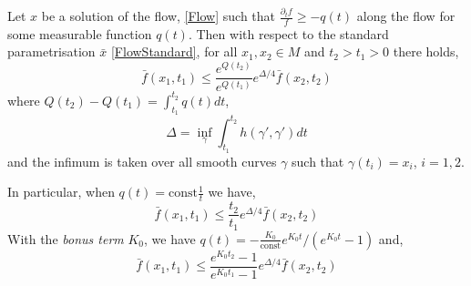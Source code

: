 \begin{thm}
Let $x$ be a solution of the flow, \eqref{Flow} such that $\tfrac{\partial_t f}{f} \geq -q(t)$ along the flow for some measurable function $q(t)$. Then with respect to the standard parametrisation $\bar{x}$ \eqref{FlowStandard}, for all $x_1, x_2 \in M$ and $t_2 > t_1 > 0$ there holds,
\[
\bar{f} (x_1, t_1) \leq \frac{e^{Q(t_2)}}{e^{Q(t_1)}} e^{\Delta/4} \bar{f} (x_2, t_2)
\]
where $Q(t_2) - Q(t_1) = \int_{t_1}^{t_2} q(t) dt$,
\[
\Delta = \inf_{\gamma} \int_{t_1}^{t_2} h(\gamma', \gamma') dt
\]
and the infimum is taken over all smooth curves $\gamma$ such that $\gamma(t_i) = x_i$, $i = 1,2$.

In particular, when $q(t) = \text{const} \tfrac{1}{t}$ we have,
\[
\bar{f} (x_1, t_1) \leq \frac{t_2}{t_1} e^{\Delta/4} \bar{f} (x_2, t_2)
\]
With the \emph{bonus term} $K_0$, we have $q(t) = -\tfrac{K_0}{\text{const}} e^{K_0 t}/(e^{K_0 t} - 1)$ and,
\[
\bar{f} (x_1, t_1) \leq \frac{e^{K_0 t_2} - 1}{e^{K_0 t_1} - 1} e^{\Delta/4} \bar{f} (x_2, t_2)
\]
\end{thm}

